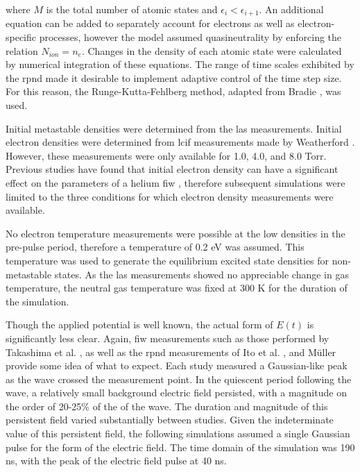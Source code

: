where $M$ is the total number of atomic states and $\epsilon_i <
\epsilon_{i+1}$. An additional equation can be added to separately account for
electrons as well as electron-specific processes, however the model assumed
quasineutrality by enforcing the relation $N_{ion}=n_e$. Changes in the density
of each atomic state were calculated by numerical integration of these
equations. The range of time scales exhibited by the \acs{rpnd} made it
desirable to implement adaptive control of the time step size. For this reason,
the Runge-Kutta-Fehlberg method, adapted from Bradie \cite{Bradie2006}, was
used.

Initial metastable densities were determined from the \acs{las} measurements.
Initial electron densities were determined from \acs{lcif} measurements made by
Weatherford \cite{Weatherford2012a}. However, these measurements were only
available for 1.0, 4.0, and 8.0 Torr. Previous studies have found that initial
electron density can have a significant effect on the parameters of a helium
\acs{fiw} \cite{Takashima2011}, therefore subsequent simulations were limited to
the three conditions for which electron density measurements were available.

No electron temperature measurements were possible at the low densities in the
pre-pulse period, therefore a temperature of 0.2 eV was assumed. This
temperature was used to generate the equilibrium excited state densities for
non-metastable states. As the \acs{las} measurements showed no appreciable
change in gas temperature, the neutral gas temperature was fixed at 300 K for
the duration of the simulation.  

Though the applied potential is well known, the actual form of $E(t)$ is
significantly less clear. Again, \acs{fiw} measurements such as those performed
by Takashima et al. \cite{Takashima2011}, as well as the \acs{rpnd} measurements
of Ito et al. \cite{Ito2010}, and M\"{u}ller \cite{Muller2011a} provide some
idea of what to expect. Each study measured a Gaussian-like peak as the wave
crossed the measurement point. In the quiescent period following the wave, a
relatively small background electric field persisted, with a magnitude on the
order of 20-25\% of the of the wave. The duration and magnitude of this
persistent field varied substantially between studies. Given the indeterminate
value of this persistent field, the following simulations assumed a single
Gaussian pulse for the form of the electric field. The time domain of the
simulation was 190 ns, with the peak of the electric field pulse at 40 ns.

